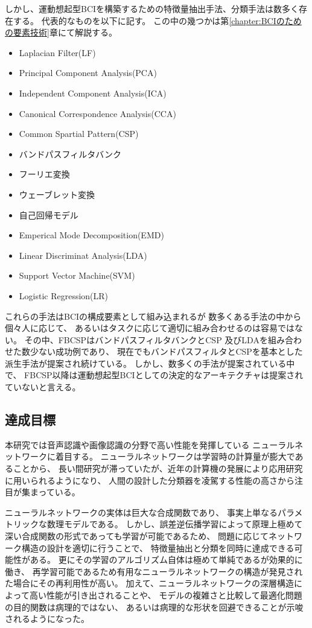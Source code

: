 しかし、運動想起型BCIを構築するための特徴量抽出手法、分類手法は数多く存在する。
代表的なものを以下に記す。
この中の幾つかは第\ref{chapter:BCIのための要素技術}章にて解説する。
\begin{itemize}
    \item Laplacian Filter(LF)
    \item Principal Component Analysis(PCA)
    \item Independent Component Analysis(ICA)
    \item Canonical Correspondence Analysis(CCA)
    \item Common Spartial Pattern(CSP)
    \item バンドパスフィルタバンク
    \item フーリエ変換
    \item ウェーブレット変換
    \item 自己回帰モデル
    \item Emperical Mode Decomposition(EMD)
    \item Linear Discriminat Analysis(LDA)
    \item Support Vector Machine(SVM)
    \item Logistic Regression(LR)
\end{itemize}
これらの手法はBCIの構成要素として組み込まれるが
数多くある手法の中から個々人に応じて、
あるいはタスクに応じて適切に組み合わせるのは容易ではない。
その中、FBCSPはバンドパスフィルタバンクとCSP
及びLDAを組み合わせた数少ない成功例であり、
現在でもバンドパスフィルタとCSPを基本とした
派生手法が提案され続けている\cite{sparsemethod,bootCSP}。
しかし、数多くの手法が提案されている中で、
FBCSP以降は運動想起型BCIとしての決定的なアーキテクチャは提案されていないと言える。

\subsection{\mc 達成目標}
本研究では音声認識や画像認識の分野で高い性能を発揮している
ニューラルネットワークに着目する。
ニューラルネットワークは学習時の計算量が膨大であることから、
長い間研究が滞っていたが、近年の計算機の発展により応用研究に用いられるようになり、
人間の設計した分類器を凌駕する性能の高さから注目が集まっている。

ニューラルネットワークの実体は巨大な合成関数であり、
事実上単なるパラメトリックな数理モデルである。
しかし、誤差逆伝播学習によって原理上極めて
深い合成関数の形式であっても学習が可能であるため、
問題に応じてネットワーク構造の設計を適切に行うことで、
特徴量抽出と分類を同時に達成できる可能性がある。
更にその学習のアルゴリズム自体は極めて単純であるが効果的に働き\cite{CheapLearning}、
再学習可能であるため有用なニューラルネットワークの構造が発見された場合にその再利用性が高い。
加えて、ニューラルネットワークの深層構造によって高い性能が引き出されること\cite{DeepvsShallow}や、
モデルの複雑さと比較して最適化問題の目的関数は病理的ではない、
あるいは病理的な形状を回避できることが示唆されるようになった\cite{ディープローカルミニマム}。

